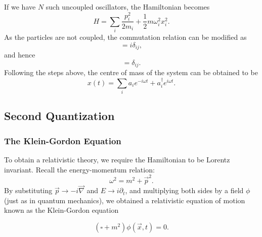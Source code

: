 \documentclass[11pt]{article}
\theoremstyle{definition}
\begin{document}
If we have $N$ such uncoupled oscillators, the Hamiltonian becomes
\begin{equation}
    H = \sum_i \frac{p_i^2}{2m_i} + \frac{1}{2}m\omega_i^2x_i^2.
\end{equation}
As the particles are not coupled, the commutation relation can be modified as
\begin{equation}
    [x_i, p_i] = i\delta_{ij},
\end{equation}
and hence
\begin{equation}
    [a_i, a_j^\dagger] = \delta_{ij}.
    \label{Eq. QM commutation}
\end{equation}
Following the steps above, the centre of mass of the system can be obtained to be
\begin{equation}
    x(t) = \sum_i  a_ie^{-i\omega t} + a_i^\dagger e^{i\omega t}.
    \label{Eq. CoM}
\end{equation}
\subsection{Second Quantization}
\subsubsection{The Klein-Gordon Equation}
To obtain a relativistic theory, we require the Hamiltonian to be Lorentz invariant. Recall the energy-momentum relation: 
\begin{equation}
    \omega^2 = m^2 + \vec{p}^2.
\end{equation}
By substituting $\vec{p} \rightarrow -i\vec{\nabla}$ and $E \rightarrow i\partial_t$, and multiplying both sides by a field $\phi$ (just as in quantum mechanics), we obtained a relativistic equation of motion known as the Klein-Gordon equation
\begin{shaded}
    \begin{equation}
        (\square + m^2)\phi(\vec{x}, t) = 0.
    \end{equation}
\end{shaded}
\end{document}
